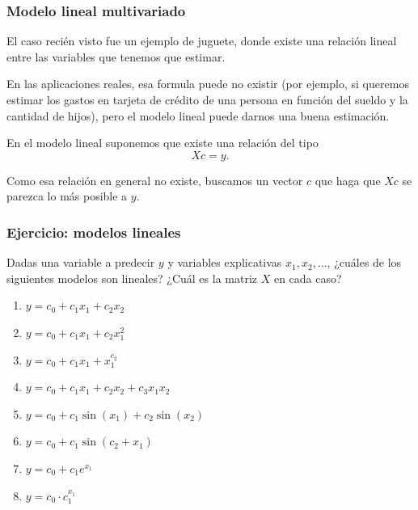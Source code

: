 \documentclass[aspectratio=169,12pt]{beamer}
\begin{document}
\begin{frame}
\frametitle{Modelo lineal multivariado}

El caso recién visto fue un ejemplo de juguete, donde existe una relación lineal entre las variables que tenemos que estimar.

En las aplicaciones reales, esa formula puede no existir (por ejemplo, si queremos estimar los gastos en tarjeta de crédito de una persona en función del sueldo y la cantidad de hijos), pero el modelo lineal puede darnos una buena estimación.

En el modelo lineal suponemos que existe una relación del tipo
$$ X c = y.$$

Como esa relación en general no existe, buscamos un vector $c$ que haga que $X c$ se parezca lo más posible a $y$.

\end{frame}


\begin{frame}
\frametitle{Ejercicio: modelos lineales}

Dadas una variable a predecir $y$ y variables explicativas $x_1, x_2, \dots$, ¿cuáles de los siguientes modelos son lineales? ¿Cuál es la matriz $X$ en cada caso?

\begin{enumerate}
\item $y = c_0 + c_1 x_1 + c_2 x_2$
\item $y = c_0 + c_1 x_1 + c_2 x_1^2$
\item $y = c_0 + c_1 x_1 + x_1^{c_2}$
\item $y = c_0 + c_1 x_1 + c_2 x_2 + c_3 x_1 x_2$
\item $y = c_0 + c_1 \sin(x_1) + c_2 \sin(x_2)$
\item $y = c_0 + c_1 \sin(c_2 + x_1)$
\item $y = c_0 + c_1 e^{x_1}$
\item $y = c_0 \cdot c_1 ^{x_1}$
\end{enumerate}

\end{frame}
\end{document}
